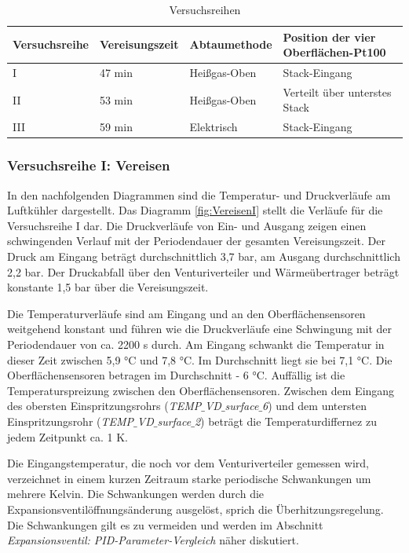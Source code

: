 \begin{table}[htb]
\centering
\caption{Versuchsreihen}\vspace{6pt}
\begin{tabular}{llll}
\hline 
\textbf{Versuchsreihe} & \textbf{Vereisungszeit} & \textbf{Abtaumethode} & \textbf{Position der vier Oberflächen-Pt100} \\ 
\hline 
\hline 
I & 47 min  & Heißgas-Oben & Stack-Eingang \\ 
\hline 
II & 53 min  & Heißgas-Oben & Verteilt über unterstes Stack \\ 
\hline 
III & 59 min & Elektrisch & Stack-Eingang \\ 
\hline 
\hline 
\end{tabular} 
\label{tab:Versuchsreihe}
\end{table}


\subsubsection*{Versuchsreihe I: Vereisen}


In den nachfolgenden Diagrammen sind die Temperatur- und Druckverläufe am Luftkühler dargestellt. Das Diagramm \ref{fig:VereisenI} stellt die Verläufe für die Versuchsreihe I dar. Die Druckverläufe von Ein- und Ausgang zeigen einen schwingenden Verlauf mit der Periodendauer der gesamten Vereisungszeit. Der Druck am Eingang beträgt durchschnittlich 3,7 bar, am Ausgang durchschnittlich 2,2 bar. Der Druckabfall über den Venturiverteiler und Wärmeübertrager beträgt konstante 1,5 bar über die Vereisungszeit. 

Die Temperaturverläufe sind am Eingang und an den Oberflächensensoren weitgehend konstant und führen wie die Druckverläufe eine Schwingung mit der Periodendauer von ca. 2200 s durch. Am Eingang schwankt die Temperatur in dieser Zeit zwischen 5,9 °C und 7,8 °C. Im Durchschnitt liegt sie bei 7,1 °C. Die Oberflächensensoren betragen im Durchschnitt - 6 °C. Auffällig ist die Temperaturspreizung zwischen den Oberflächensensoren. Zwischen dem Eingang des obersten Einspritzungsrohrs (\textit{TEMP$\_$VD$\_$surface$\_$6}) und dem untersten Einspritzungsrohr (\textit{TEMP$\_$VD$\_$surface$\_$2}) beträgt die Temperaturdiffernez zu jedem Zeitpunkt ca. 1 K. 

Die Eingangstemperatur, die noch vor dem Venturiverteiler gemessen wird, verzeichnet in einem kurzen Zeitraum starke periodische Schwankungen um mehrere Kelvin. Die Schwankungen werden durch die Expansionsventilöffnungsänderung ausgelöst, sprich die Überhitzungsregelung.  Die Schwankungen gilt es zu vermeiden und werden im Abschnitt \textit{Expansionsventil: PID-Parameter-Vergleich} näher diskutiert. 

